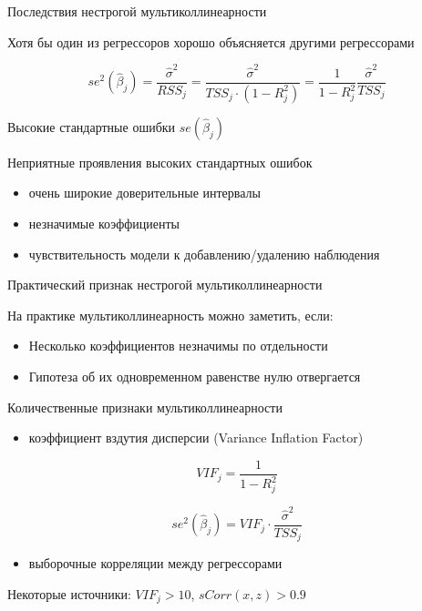 \documentclass[russian,ignorenonframetext,]{beamer}
\providecommand{\tightlist}{%
  \setlength{\itemsep}{0pt}\setlength{\parskip}{0pt}}
\begin{document}
\begin{frame}{Последствия нестрогой мультиколлинеарности}

Хотя бы один из регрессоров хорошо объясняется другими регрессорами

\[
se^2(\hat{\beta}_j)=\frac{\hat{\sigma}^2}{RSS_j}=\frac{\hat{\sigma}^2}{TSS_j\cdot (1-R^2_j)}=
\frac{1}{1-R^2_j}\frac{\hat{\sigma}^2}{TSS_j}
\]

Высокие стандартные ошибки \(se(\hat{\beta}_j)\)

\end{frame}

\begin{frame}{Неприятные проявления высоких стандартных ошибок}

\begin{itemize}
\tightlist
\item
  очень широкие доверительные интервалы
\item
  незначимые коэффициенты
\item
  чувствительность модели к добавлению/удалению наблюдения
\end{itemize}

\end{frame}

\begin{frame}{Практический признак нестрогой мультиколлинеарности}

На практике мультиколлинеарность можно заметить, если:

\begin{itemize}
\item
  Несколько коэффициентов незначимы по отдельности
\item
  Гипотеза об их одновременном равенстве нулю отвергается
\end{itemize}

\end{frame}

\begin{frame}{Количественные признаки мультиколлинеарности}

\begin{itemize}
\tightlist
\item
  коэффициент вздутия дисперсии (Variance Inflation Factor)
\end{itemize}

\[
VIF_j=\frac{1}{1-R^2_j}
\]

\[
se^2(\hat{\beta}_j)=VIF_j \cdot \frac{\hat{\sigma}^2}{TSS_j}
\]

\begin{itemize}
\tightlist
\item
  выборочные корреляции между регрессорами
\end{itemize}

Некоторые источники: \(VIF_j > 10\), \(sCorr(x,z)>0.9\)

\end{frame}
\end{document}
